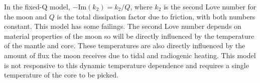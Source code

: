 \documentclass[12pt, onecolumn]{revtex4-2}    %
\begin{document}



In the fixed-Q model, $-\text{Im}(k_2) = k_2 / Q$, where $k_2$ is the second Love number for the moon and $Q$ is the total dissipation factor due to friction, with both numbers constant.
This model has some failings.
The second Love number depends on material properties of the moon so will be directly influenced by the temperature of the mantle and core.
These temperatures are also directly influenced by the amount of flux the moon receives due to tidal and radiogenic heating.
This model is not responsive to this dynamic temperature dependence and requires a single temperature of the core to be picked.
\end{document}
